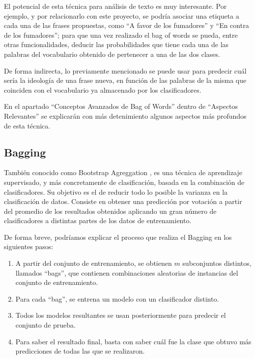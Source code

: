 El potencial de esta técnica para análisis de texto es muy interesante. Por ejemplo, y por relacionarlo con este proyecto, se podría asociar una etiqueta a cada una de las frases propuestas, como ``A favor de los fumadores'' y ``En contra de los fumadores''; para que una vez realizado el bag of words se pueda, entre otras funcionalidades, deducir las probabilidades que tiene cada una de las palabras del vocabulario obtenido de pertenecer a una de las dos clases.

De forma indirecta, lo previamente mencionado se puede usar para predecir cuál sería la ideología de una frase nueva, en función de las palabras de la misma que coinciden con el vocabulario ya almacenado por los clasificadores.

En el apartado ``Conceptos Avanzados de Bag of Words'' dentro de ``Aspectos Relevantes'' se explicarán con más detenimiento algunos aspectos más profundos de esta técnica.


\subsection{Bagging}

También conocido como Bootstrap Agreggation \cite{breiman1996bagging}, es una técnica de aprendizaje supervisado, y más concretamente de clasificación, basada en la combinación de clasificadores. Su objetivo es el de reducir todo lo posible la varianza en la clasificación de datos. Consiste en obtener una predicción por votación a partir del promedio de los resultados obtenidos aplicando un gran número de clasificadores a distintas partes de los datos de entrenamiento.

De forma breve, podríamos explicar el proceso que realiza el Bagging en los siguientes pasos:

\begin{enumerate}

\item  A partir del conjunto de entrenamiento, se obtienen $m$ subconjuntos distintos, llamados ``bags'', que contienen combinaciones aleatorias de instancias del conjunto de entrenamiento.

\item Para cada ``bag'', se entrena un modelo con un clasificador distinto.

\item Todos los modelos resultantes se usan posteriormente para predecir el conjunto de prueba.

\item Para saber el resultado final, basta con saber cuál fue la clase que obtuvo más predicciones de todas las que se realizaron.

\end{enumerate}

